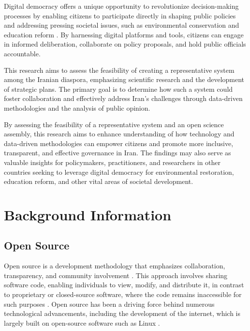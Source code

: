 \documentclass{IEEEtran}
\begin{document}
Digital democracy offers a unique opportunity to revolutionize decision-making processes by enabling citizens to participate directly in shaping public policies and addressing pressing societal issues, such as environmental conservation and education reform \cite{coleman2009internet}. By harnessing digital platforms and tools, citizens can engage in informed deliberation, collaborate on policy proposals, and hold public officials accountable.

This research aims to assess the feasibility of creating a representative system among the Iranian diaspora, emphasizing scientific research and the development of strategic plans. The primary goal is to determine how such a system could foster collaboration and effectively address Iran's challenges through data-driven methodologies and the analysis of public opinion.


By assessing the feasibility of a representative system and an open science assembly, this research aims to enhance understanding of how technology and data-driven methodologies can empower citizens and promote more inclusive, transparent, and effective governance in Iran. The findings may also serve as valuable insights for policymakers, practitioners, and researchers in other countries seeking to leverage digital democracy for environmental restoration, education reform, and other vital areas of societal development.

\section{Background Information}

\subsection{Open Source}
Open source is a development methodology that emphasizes collaboration, transparency, and community involvement \cite{dibona1999opensource}. This approach involves sharing software code, enabling individuals to view, modify, and distribute it, in contrast to proprietary or closed-source software, where the code remains inaccessible for such purposes \cite{dibona1999opensource}. Open source has been a driving force behind numerous technological advancements, including the development of the internet, which is largely built on open-source software such as Linux \cite{dibona1999opensource}.
\end{document}
